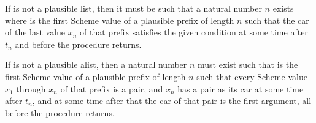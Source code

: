 \begin{entry}{%
}


If  is not a plausible list, then it must be such that a
natural number $n$ exists where  is the first Scheme value of a
plausible prefix of length $n$ such that the car of the last value $x_n$ of that
prefix satisfies the given condition at some time after $t_n$ and before
the procedure returns.
\end{entry}

\begin{entry}{%
}


If  is not a plausible alist, then a natural number $n$ must
exist such that  is the first Scheme value of a plausible
prefix of length $n$ such that every Scheme value $x_1$ through $x_n$
of that prefix is a pair, and $x_n$ has a pair as its car at some time
after $t_n$, and at some time after that the car of that pair is the
first argument, all before the procedure returns.
\end{entry}

